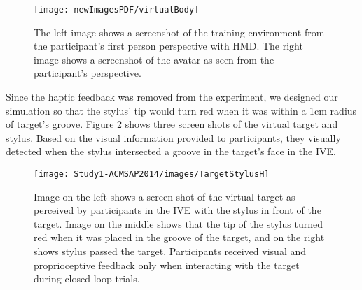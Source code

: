 \begin{figure}[th!]
	\centering
	\texttt{[image: newImagesPDF/virtualBody]}
	\caption{The left image shows a screenshot of the training environment from the participant’s first person perspective with HMD. The right image shows a screenshot of the avatar as seen from the participant’s perspective.}
	\label{fig:virtualBody}
	
\end{figure}

Since the haptic feedback was removed from the experiment, we designed our simulation so that the stylus' tip would turn red when it was within a 1cm radius of target's groove. Figure \ref{fig:Target_Stylus} shows three screen shots of the virtual target and stylus. Based on the visual information provided to participants, they visually detected when the stylus intersected a groove in the target's face in the IVE.

\begin{figure}[th!]
	\centering
	\texttt{[image: Study1-ACMSAP2014/images/TargetStylusH]}
	\caption{Image on the left shows a screen shot of the virtual target as perceived by participants in the IVE with the stylus in front of the target. Image on the middle shows that the tip of the stylus turned red when it was placed in the groove of the target, and on the right shows stylus passed the target. Participants received visual and proprioceptive feedback only when interacting with the target during closed-loop trials.}
	\label{fig:Target_Stylus}
	
\end{figure}

